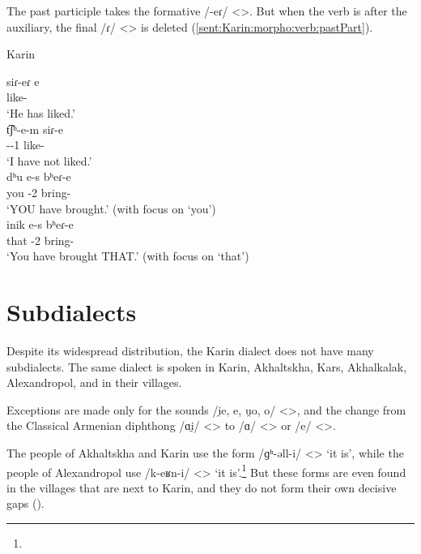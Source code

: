 The past participle takes the formative /-eɾ/ <>. But when the verb is after the auxiliary, the final /ɾ/ <> is deleted (\ref{sent:Karin:morpho:verb:pastPart}). 

\begin{exe}
	\ex Karin \label{sent:Karin:morpho:verb:pastPart}
	\begin{xlist}
		\ex \gll siɾ-eɾ e \\
		like-{\perfcvb} {\aux} \\
		\trans `He has liked.'\\
		\ex \gll t͡ʃʰ-e-m siɾ-e \\
		{\neggloss}-{\aux}-1{\sg} like-{\perfcvb} \\
		\trans `I have not liked.'\\
		\ex \gll dʰu e-s bʰeɾ-e \\
		you {\aux}-2{\sg} bring-{\perfcvb} \\
		\trans `YOU have brought.' (with focus on `you')\\
		\ex \gll inik e-s bʰeɾ-e \\
		that {\aux}-2{\sg} bring-{\perfcvb} \\
		\trans `You have brought THAT.' (with focus on `that')\\
	\end{xlist}
\end{exe}

\section{Subdialects}

Despite its widespread distribution, the Karin dialect does not have many subdialects. The same dialect is spoken in Karin, Akhaltskha, Kars, Akhalkalak, Alexandropol, and in their villages. 

Exceptions are made only for the sounds /i̯e, e, u̯o, o/ <>, and the change from the Classical Armenian diphthong /ɑi̯/ <> to /ɑ/ <> or /e/ <>. 

The people of Akhaltskha and Karin use the form /ɡʰ-əll-i/ <> `it is', while the people of Alexandropol use /k-eʁn-i/ <> `it is'.\footnote{} But these forms are even found in the villages that are next to Karin, and they do not form their own decisive gaps (). 

